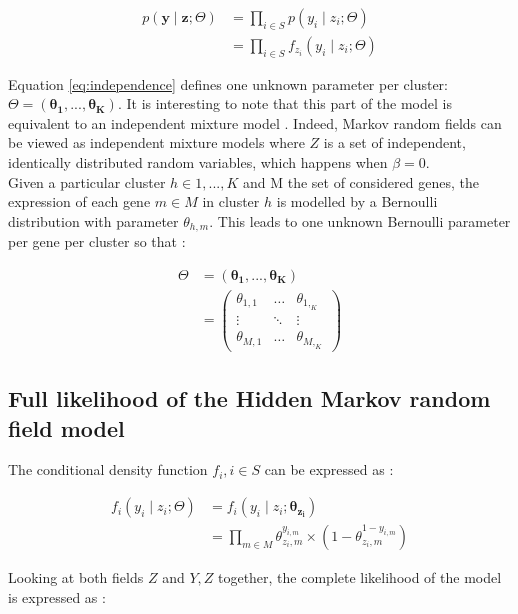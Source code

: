 \begin{align}
p(\boldsymbol{y} \mid \boldsymbol{z} ; \Theta) &= \prod_{i \in S} p(y_i \mid z_i ; \Theta) \nonumber\\
\label{eq:independence}
&= \prod_{i \in S} f_{z_i} (y_i \mid z_i ; \Theta)
\end{align}

Equation \ref{eq:independence} defines one unknown parameter per cluster: $\Theta = (\boldsymbol{\theta_1},...,\boldsymbol{\theta_K})$. It is interesting to note that this part of the model is equivalent to an independent mixture model \citep{mclachlan04}. Indeed, Markov random fields can be viewed as independent mixture models where $Z$ is a set of independent, identically distributed random variables, which happens when $\beta = 0$.\\

Given a particular cluster $h \in {1,...,K}$ and M the set of considered genes, the expression of each gene $m \in M$ in cluster $h$ is modelled by a Bernoulli distribution with parameter $\theta_{h,m}$. This leads to one unknown Bernoulli parameter per gene per cluster so that :

\begin{align*}
\Theta &= (\boldsymbol{\theta_1},...,\boldsymbol{\theta_K})\\
&= \left( \begin{array} {ccc}
\theta_{1,1} & \ldots  & \theta_{1,_K}\\
\vdots & \ddots & \vdots\\
\theta_{M,1} & \ldots & \theta_{M,_K} \end{array} \right)
\end{align*}

	\subsection{Full likelihood of the Hidden Markov random field model}

The conditional density function $f_i, i \in S$ can be expressed as :

\begin{align}
f_i(y_i \mid z_i ; \Theta) &= f_i(y_i \mid z_i ; \boldsymbol{\theta_{z_i}}) \nonumber\\ 
&= \prod_{m \in M} \theta_{z_i,m}^{y_{i,m}} \times (1-\theta_{z_i,m}^{1-y_{i,m}})
\end{align}

Looking at both fields $Z$ and $Y, Z$ together, the complete likelihood of the model is expressed as :

